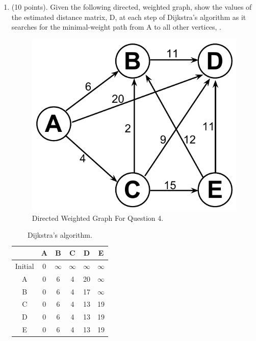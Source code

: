 \documentclass{article}
\begin{document}
\begin{enumerate}
\item (10 points). Given the following directed, weighted graph, show
  the values of the estimated distance matrix, D, at each step of
  Dijkstra’s algorithm as it searches for the minimal-weight path from A
  to all other vertices, .
 
\begin{figure}[H]
\begin{center}
\includegraphics[scale=0.5]{q4-graph}
\caption{Directed Weighted Graph For Question 4.\label{tbl:dij_alg}}
\end{center}
\vspace{-20pt}
\end{figure}

\begin{table}[H]
  \begin{center}
    \begin{tabular}{|c|c|c|c|c|c|} 
      \hline & A & B & C & D & E \\
      \hline Initial & 0 &$\infty$&$\infty$&$\infty$&$\infty$ \\
      \hline A&0&6&4&20&$\infty$ \\
      \hline B&0&6&4&17&$\infty$ \\
      \hline C&0&6&4&13&19 \\
      \hline D&0&6&4&13&19 \\
      \hline E&0&6&4&13&19 \\
      \hline
    \end{tabular}
    \caption{Dijkstra’s algorithm. \label{tbl:dij_alg}} 
    \vspace{-15pt}
  \end{center}
\end{table}


\end{enumerate}
\end{document}
